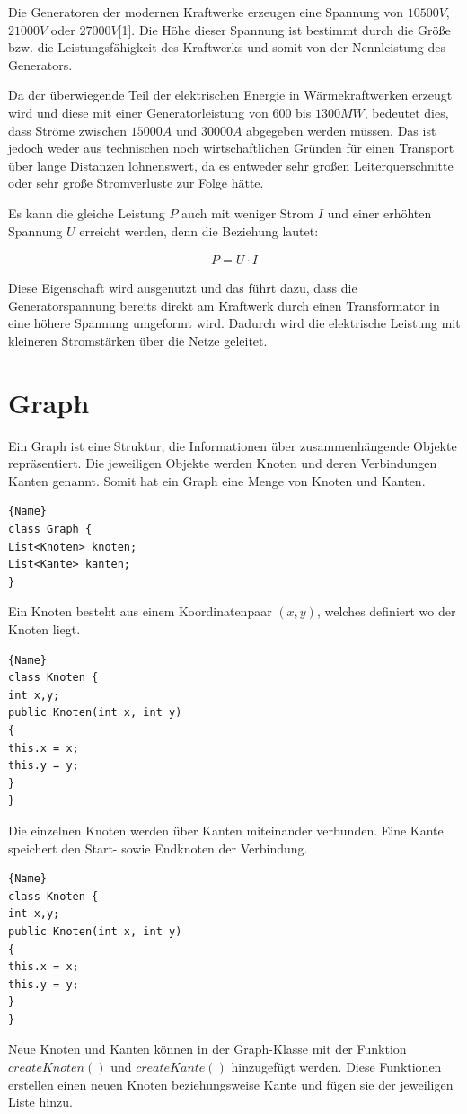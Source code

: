 Die Generatoren der modernen Kraftwerke erzeugen eine Spannung von $10500 V$, $21000V$ oder $27000V$[1]. Die Höhe dieser Spannung ist bestimmt durch die Größe bzw. die Leistungsfähigkeit des Kraftwerks und somit von der Nennleistung des Generators.

Da der überwiegende Teil der elektrischen Energie in Wärmekraftwerken erzeugt wird und diese mit einer Generatorleistung von $600$ bis $1300MW$, bedeutet dies, dass Ströme zwischen $15000A$ und $30000A$ abgegeben werden müssen. Das ist jedoch weder aus technischen noch wirtschaftlichen Gründen für einen Transport über lange Distanzen lohnenswert, da es entweder sehr großen Leiterquerschnitte oder sehr große Stromverluste zur Folge hätte.

Es kann die gleiche Leistung $P$ auch mit weniger Strom $I$ und einer erhöhten Spannung $U$ erreicht werden, denn die Beziehung lautet:

\begin{align}
	P = U \cdot I
\end{align}  

Diese Eigenschaft wird ausgenutzt und das führt dazu, dass die Generatorspannung bereits direkt am Kraftwerk durch einen Transformator in eine höhere Spannung umgeformt wird. Dadurch wird die elektrische Leistung mit kleineren Stromstärken über die Netze geleitet.



\section{Graph}
\label{Graph}
%
Ein Graph ist eine Struktur, die Informationen über zusammenhängende Objekte repräsentiert. Die jeweiligen Objekte werden Knoten und deren Verbindungen Kanten genannt.
Somit hat ein Graph eine Menge von Knoten und Kanten.
\begin{lstlisting}[style=C++, caption=Struktur des Graphen]{Name}
class Graph {
List<Knoten> knoten;
List<Kante> kanten;
}
\end{lstlisting}
Ein Knoten besteht aus einem Koordinatenpaar $(x,y)$, welches definiert wo der Knoten liegt.
\begin{lstlisting}[style=C++, caption=Struktur eines Knotens]{Name}
class Knoten {
int x,y;
public Knoten(int x, int y)
{	
this.x = x;
this.y = y;
}	
}
\end{lstlisting}
Die einzelnen Knoten werden über Kanten miteinander verbunden. Eine Kante speichert den Start- sowie Endknoten der Verbindung.
\begin{lstlisting}[style=C++, caption=Struktur eines Knotens]{Name}
class Knoten {
int x,y;
public Knoten(int x, int y)
{	
this.x = x;
this.y = y;
}	
}
\end{lstlisting}
Neue Knoten und Kanten können in der Graph-Klasse mit der Funktion $createKnoten()$ und $createKante()$ hinzugefügt werden. Diese Funktionen erstellen einen neuen Knoten beziehungsweise Kante und fügen sie der jeweiligen Liste hinzu.

